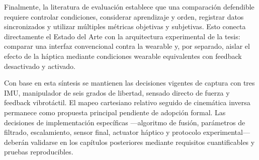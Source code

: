 Finalmente, la literatura de evaluación establece que una comparación defendible requiere controlar condiciones, considerar aprendizaje y orden, registrar datos sincronizados y utilizar múltiples métricas objetivas y subjetivas. Esto conecta directamente el Estado del Arte con la arquitectura experimental de la tesis: comparar una interfaz convencional contra la wearable y, por separado, aislar el efecto de la háptica mediante condiciones wearable equivalentes con feedback desactivado y activado.

Con base en esta síntesis se mantienen las decisiones vigentes de captura con tres IMU, manipulador de seis grados de libertad, sensado directo de fuerza y feedback vibrotáctil. El mapeo cartesiano relativo seguido de cinemática inversa permanece como propuesta principal pendiente de adopción formal. Las decisiones de implementación específicas ---algoritmo de fusión, parámetros de filtrado, escalamiento, sensor final, actuator háptico y protocolo experimental--- deberán validarse en los capítulos posteriores mediante requisitos cuantificables y pruebas reproducibles.
